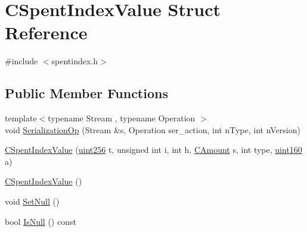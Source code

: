 \hypertarget{struct_c_spent_index_value}{}\section{C\+Spent\+Index\+Value Struct Reference}
\label{struct_c_spent_index_value}


{\ttfamily \#include $<$spentindex.\+h$>$}

\subsection*{Public Member Functions}
\begin{DoxyCompactItemize}
\item 
{\footnotesize template$<$typename Stream , typename Operation $>$ }\\void \mbox{\hyperlink{struct_c_spent_index_value_a8b617f5616dc075afa35abe3b33ae508}{Serialization\+Op}} (Stream \&s, Operation ser\+\_\+action, int n\+Type, int n\+Version)
\item 
\mbox{\hyperlink{struct_c_spent_index_value_a1b4bd7a916283df5d46a685ab442e299}{C\+Spent\+Index\+Value}} (\mbox{\hyperlink{classuint256}{uint256}} t, unsigned int i, int h, \mbox{\hyperlink{amount_8h_a4eaf3a5239714d8c45b851527f7cb564}{C\+Amount}} s, int type, \mbox{\hyperlink{classuint160}{uint160}} a)
\item 
\mbox{\hyperlink{struct_c_spent_index_value_a5f7902635cf2cb54ffc48b1f83405753}{C\+Spent\+Index\+Value}} ()
\item 
void \mbox{\hyperlink{struct_c_spent_index_value_a7f192b517b49e009d5e8ab1dca9f429d}{Set\+Null}} ()
\item 
bool \mbox{\hyperlink{struct_c_spent_index_value_a296c78f5ded6222a7f1e93f4697f32d9}{Is\+Null}} () const
\end{DoxyCompactItemize}
